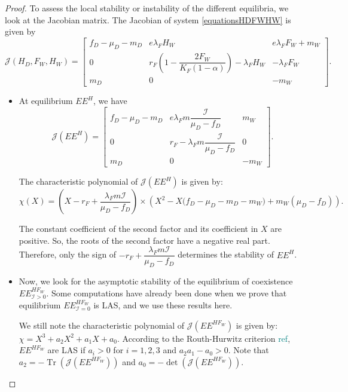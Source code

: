 \documentclass{article}
\newcommand{\lfw}{\lambda_{F}}
\newcommand{\lfw}{\lambda_{F}}
\newcommand{\cI}{\mathcal{I}}
\newcommand{\marc}[1]{\textcolor{teal}{#1}}
\DeclareMathOperator{\Tr}{Tr}
\begin{document}
\begin{proof}
To assess the local stability or instability of the different equilibria, we look at the Jacobian matrix. The Jacobian of system \eqref{equationsHDFWHW} is given by
\begin{equation*}
\mathcal{J}(H_D, F_W, H_W) = \begin{bmatrix}
f_D-\mu_D - m_D & e \lfw H_W & e\lfw F_W + m_W \\
0 & r_F \left( 1 - \dfrac{2F_W}{K_F(1-\alpha)} \right) - \lfw H_W & - \lfw F_W \\
m_D & 0 & -m_W
\end{bmatrix}.
\end{equation*}
\begin{itemize}
\item At equilibrium $EE^{H}$, we have
\begin{equation*}
\mathcal{J}(EE^{H}) = \begin{bmatrix}
f_D-\mu_D - m_D & e \lfw m \dfrac{\cI}{\mu_D - f_D} & m_W \\
0 & r_F - \lfw m \dfrac{\cI}{\mu_D - f_D} & 0 \\
m_D & 0 & -m_W
\end{bmatrix}.
\end{equation*}


The characteristic polynomial of $\mathcal{J}(EE^{H})$ is given by:
\begin{equation*}
\chi(X) = (X - r_F + \dfrac{\lfw m \cI}{\mu_D - f_D}) \times \left(X^2 - X\Big(f_D - \mu_D - m_D - m_W \Big) + m_W(\mu_D - f_D)\right).
\end{equation*}

The constant coefficient of the second factor and its coefficient in $X$ are positive. So, the roots of the second factor have a negative real part. Therefore, only the sign of $-r_F + \dfrac{\lfw m \cI}{\mu_D - f_D}$ determines the stability of $EE^{H}$.

\item Now, we look for the asymptotic stability of the equilibrium of coexistence $EE^{HF_W}_{\cI > 0}$. Some computations have already been done when we prove that equilibrium $EE^{HF_W}_{\cI = 0}$ is LAS, and we use these results here. 

We still note the characteristic polynomial of $\mathcal{J}(EE^{H F_W})$ is given by: $\chi = X^3 + a_2 X^2 + a_1 X + a_0$. According to the Routh-Hurwitz criterion \marc{ref}, $EE^{H F_W}$ are LAS if $a_i > 0$ for $i=1,2,3$ and $a_2 a_1 - a_0 > 0$. Note that $a_2 = - \Tr(\mathcal{J}(EE^{H F_W}))$ and $a_0 = - \det (\mathcal{J}(EE^{H F_W}))$.


\end{itemize}
\end{proof}
\end{document}
